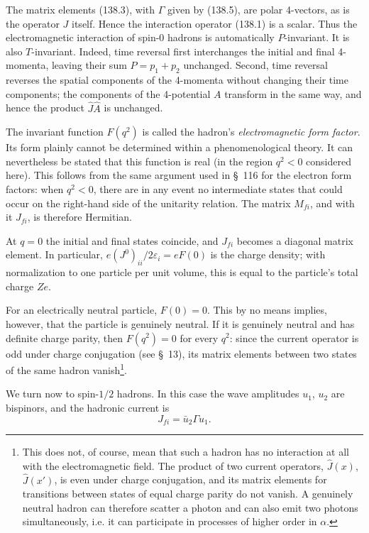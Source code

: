 The matrix elements (138.3), with $\Gamma$ given by (138.5), are polar 4-vectors, as is the operator $J$ itself. Hence the interaction operator (138.1) is a scalar. Thus the electromagnetic interaction of spin-0 hadrons is automatically $P$-invariant. It is also $T$-invariant. Indeed, time reversal first interchanges the initial and final 4-momenta, leaving their sum $P=p_1+p_2$ unchanged. Second, time reversal reverses the spatial components of the 4-momenta without changing their time components; the components of the 4-potential $A$ transform in the same way, and hence the product $\widehat J\widehat A$ is unchanged.

The invariant function $F(q^2)$ is called the hadron's \emph{electromagnetic form factor}. Its form plainly cannot be determined within a phenomenological theory. It can nevertheless be stated that this function is real (in the region $q^2<0$ considered here). This follows from the same argument used in \S~116 for the electron form factors: when $q^2<0$, there are in any event no intermediate states that could occur on the right-hand side of the unitarity relation. The matrix $M_{fi}$, and with it $J_{fi}$, is therefore Hermitian.

At $q=0$ the initial and final states coincide, and $J_{fi}$ becomes a diagonal matrix element. In particular, $e(J^0)_{ii}/2\varepsilon_i=eF(0)$ is the charge density; with normalization to one particle per unit volume, this is equal to the particle's total charge $Ze$.

For an electrically neutral particle, $F(0)=0$. This by no means implies, however, that the particle is genuinely neutral. If it is genuinely neutral and has definite charge parity, then $F(q^2)=0$ for every $q^2$: since the current operator is odd under charge conjugation (see \S~13), its matrix elements between two states of the same hadron vanish\footnote{This does not, of course, mean that such a hadron has no interaction at all with the electromagnetic field. The product of two current operators, $\widehat J(x)$, $\widehat J(x')$, is even under charge conjugation, and its matrix elements for transitions between states of equal charge parity do not vanish. A genuinely neutral hadron can therefore scatter a photon and can also emit two photons simultaneously, i.e. it can participate in processes of higher order in $\alpha$.}.

We turn now to spin-$1/2$ hadrons. In this case the wave amplitudes $u_1$, $u_2$ are bispinors, and the hadronic current is
\begin{equation}
J_{fi}=\bar u_2\Gamma u_1.
\tag{138.6}
\end{equation}

